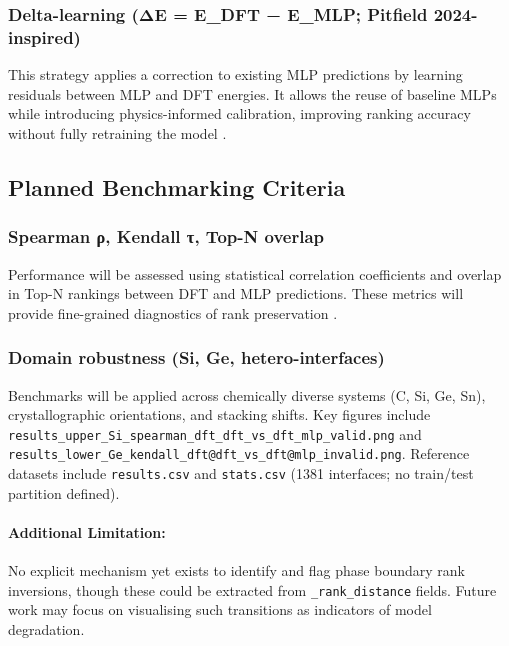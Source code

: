 \subsubsection{Delta-learning (ΔE = E\_DFT − E\_MLP; Pitfield 2024-inspired)}

This strategy applies a correction to existing MLP predictions by learning residuals between MLP and DFT energies. It allows the reuse of baseline MLPs while introducing physics-informed calibration, improving ranking accuracy without fully retraining the model .


\subsection{Planned Benchmarking Criteria}

\subsubsection{Spearman ρ, Kendall τ, Top-N overlap}

Performance will be assessed using statistical correlation coefficients and overlap in Top-N rankings between DFT and MLP predictions. These metrics will provide fine-grained diagnostics of rank preservation .


\subsubsection{Domain robustness (Si, Ge, hetero-interfaces)}

Benchmarks will be applied across chemically diverse systems (C, Si, Ge, Sn), crystallographic orientations, and stacking shifts. Key figures include \texttt{results\_upper\_Si\_spearman\_dft\_dft\_vs\_dft\_mlp\_valid.png} and \texttt{results\_lower\_Ge\_kendall\_dft@dft\_vs\_dft@mlp\_invalid.png}. Reference datasets include \texttt{results.csv} and \texttt{stats.csv} (1381 interfaces; no train/test partition defined).

\paragraph{Additional Limitation:}

No explicit mechanism yet exists to identify and flag phase boundary rank inversions, though these could be extracted from \texttt{\_rank\_distance} fields. Future work may focus on visualising such transitions as indicators of model degradation.

